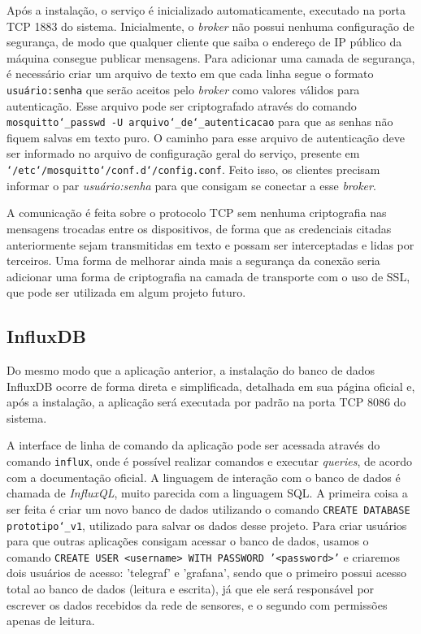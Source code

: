 \documentclass[../monografia.tex]{subfiles}
\begin{document}
Após a instalação, o serviço é inicializado automaticamente, executado na porta TCP 1883 do sistema. Inicialmente, o \textit{broker} não possui nenhuma configuração de segurança, de modo que qualquer cliente que saiba o endereço de IP público da máquina consegue publicar mensagens. Para adicionar uma camada de segurança, é necessário criar um arquivo de texto em que cada linha segue o formato \texttt{usuário:senha} que serão aceitos pelo \textit{broker} como valores válidos para autenticação. Esse arquivo pode ser criptografado através do comando \texttt{mosquitto\char`_passwd -U arquivo\char`_de\char`_autenticacao} para que as senhas não fiquem salvas em texto puro. O caminho para esse arquivo de autenticação deve ser informado no arquivo de configuração geral do serviço, presente em \texttt{\char`/etc\char`/mosquitto\char`/conf.d\char`/config.conf}. Feito isso, os clientes precisam informar o par \textit{usuário:senha} para que consigam se conectar a esse \textit{broker}.

A comunicação é feita sobre o protocolo TCP sem nenhuma criptografia nas mensagens trocadas entre os dispositivos, de forma que as credenciais citadas anteriormente sejam transmitidas em texto e possam ser interceptadas e lidas por terceiros. Uma forma de melhorar ainda mais a segurança da conexão seria adicionar uma forma de criptografia na camada de transporte com o uso de SSL, que pode ser utilizada em algum projeto futuro.

\subsection{InfluxDB}

Do mesmo modo que a aplicação anterior, a instalação do banco de dados InfluxDB ocorre de forma direta e simplificada, detalhada em sua página oficial \cite{influxdb-installation} e, após a instalação, a aplicação será executada por padrão na porta TCP 8086 do sistema. 

A interface de linha de comando da aplicação pode ser acessada através do comando \texttt{influx}, onde é possível realizar comandos e executar \textit{queries}, de acordo com a documentação oficial. A linguagem de interação com o banco de dados é chamada de \textit{InfluxQL}, muito parecida com a linguagem SQL. A primeira coisa a ser feita é criar um novo banco de dados utilizando o comando \texttt{CREATE DATABASE prototipo\char`_v1}, utilizado para salvar os dados desse projeto. Para criar usuários para que outras aplicações consigam acessar o banco de dados, usamos o comando \texttt{CREATE USER <username> WITH PASSWORD '<password>'} e criaremos dois usuários de acesso: 'telegraf' e 'grafana', sendo que o primeiro possui acesso total ao banco de dados (leitura e escrita), já que ele será responsável por escrever os dados recebidos da rede de sensores, e o segundo com permissões apenas de leitura. 
\end{document}
